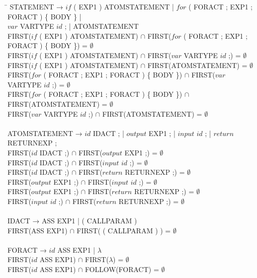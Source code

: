 \begin{tabbing}
    \hspace{0.5cm}\=\kill
    STATEMENT → $if$ ( EXP1 ) ATOMSTATEMENT | $for$ ( FORACT ; EXP1 ; FORACT ) \{ BODY \} |\\
    $var$ VARTYPE $id$ ; | ATOMSTATEMENT\\
    \>FIRST($if$ ( EXP1 ) ATOMSTATEMENT) $\cap$ FIRST($for$ ( FORACT ; EXP1 ; FORACT ) \{ BODY \}) = $\emptyset$\\
    \>FIRST($if$ ( EXP1 ) ATOMSTATEMENT) $\cap$ FIRST($var$ VARTYPE $id$ ;) = $\emptyset$\\
    \>FIRST($if$ ( EXP1 ) ATOMSTATEMENT) $\cap$ FIRST(ATOMSTATEMENT) = $\emptyset$\\
    \>FIRST($for$ ( FORACT ; EXP1 ; FORACT ) \{ BODY \}) $\cap$ FIRST($var$ VARTYPE $id$ ;) = $\emptyset$\\
    \>FIRST($for$ ( FORACT ; EXP1 ; FORACT ) \{ BODY \}) $\cap$ FIRST(ATOMSTATEMENT) = $\emptyset$\\
    \>FIRST($var$ VARTYPE $id$ ;) $\cap$ FIRST(ATOMSTATEMENT) = $\emptyset$\\
    \\
    ATOMSTATEMENT → $id$ IDACT ; | $output$ EXP1 ; | $input$ $id$ ; | $return$ RETURNEXP ;\\
    \>FIRST($id$ IDACT ;) $\cap$ FIRST($output$ EXP1 ;) = $\emptyset$\\
    \>FIRST($id$ IDACT ;) $\cap$ FIRST($input$ $id$ ;) = $\emptyset$\\
    \>FIRST($id$ IDACT ;) $\cap$ FIRST($return$ RETURNEXP ;) = $\emptyset$\\
    \>FIRST($output$ EXP1 ;) $\cap$ FIRST($input$ $id$ ;) = $\emptyset$\\
    \>FIRST($output$ EXP1 ;) $\cap$ FIRST($return$ RETURNEXP ;) = $\emptyset$\\
    \>FIRST($input$ $id$ ;) $\cap$ FIRST($return$ RETURNEXP ;) = $\emptyset$\\
    \\
    IDACT → ASS EXP1 | ( CALLPARAM )\\
    \>FIRST(ASS EXP1) $\cap$ FIRST( ( CALLPARAM ) ) = $\emptyset$\\
    \\
    FORACT → $id$ ASS EXP1 | $\lambda$\\
    \>FIRST($id$ ASS EXP1) $\cap$ FIRST($\lambda$) = $\emptyset$\\
    \>FIRST($id$ ASS EXP1) $\cap$ FOLLOW(FORACT) = $\emptyset$\\

\end{tabbing}
